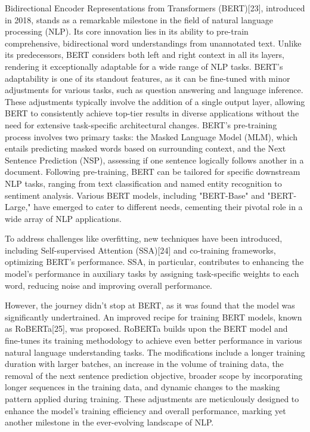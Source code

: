 \documentclass[conference]{IEEEtran}
\begin{document}
Bidirectional Encoder Representations from Transformers (BERT)[23], introduced in 2018, stands as a remarkable milestone in the field of natural language processing (NLP). Its core innovation lies in its ability to pre-train comprehensive, bidirectional word understandings from unannotated text. Unlike its predecessors, BERT considers both left and right context in all its layers, rendering it exceptionally adaptable for a wide range of NLP tasks.
BERT's adaptability is one of its standout features, as it can be fine-tuned with minor adjustments for various tasks, such as question answering and language inference. These adjustments typically involve the addition of a single output layer, allowing BERT to consistently achieve top-tier results in diverse applications without the need for extensive task-specific architectural changes. BERT's pre-training process involves two primary tasks: the Masked Language Model (MLM), which entails predicting masked words based on surrounding context, and the Next Sentence Prediction (NSP), assessing if one sentence logically follows another in a document. Following pre-training, BERT can be tailored for specific downstream NLP tasks, ranging from text classification and named entity recognition to sentiment analysis. Various BERT models, including "BERT-Base" and "BERT-Large," have emerged to cater to different needs, cementing their pivotal role in a wide array of NLP applications.


To address challenges like overfitting, new techniques have been introduced, including Self-supervised Attention (SSA)[24] and co-training frameworks, optimizing BERT's performance. SSA, in particular, contributes to enhancing the model's performance in auxiliary tasks by assigning task-specific weights to each word, reducing noise and improving overall performance.


However, the journey didn't stop at BERT, as it was found that the model was significantly undertrained. An improved recipe for training BERT models, known as RoBERTa[25], was proposed. RoBERTa builds upon the BERT model and fine-tunes its training methodology to achieve even better performance in various natural language understanding tasks. The modifications include a longer training duration with larger batches, an increase in the volume of training data, the removal of the next sentence prediction objective, broader scope by incorporating longer sequences in the training data, and dynamic changes to the masking pattern applied during training. These adjustments are meticulously designed to enhance the model's training efficiency and overall performance, marking yet another milestone in the ever-evolving landscape of NLP.
\end{document}
